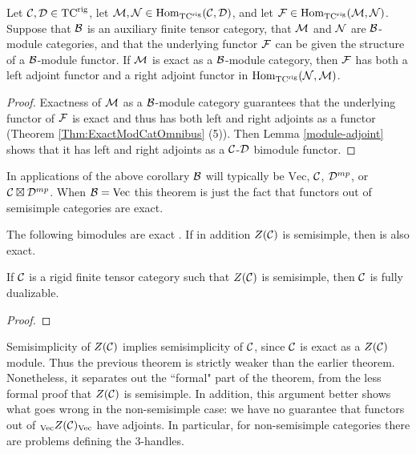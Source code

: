 \documentclass{amsart}
\begin{document}

\begin{lemma} \label{lma:2morAdjunction}
Let $\mathcal C, \mathcal D \in {\mathrm{TC}^{\text{rig}}}$, let $\mathcal M, \mathcal N \in \operatorname{Hom}_{\mathrm{TC}^{\text{rig}}}(\mathcal C,\mathcal D)$, and let $\mathcal F \in \operatorname{Hom}_{{\mathrm{TC}^{\text{rig}}}}(\mathcal M,\mathcal N)$.  Suppose that $\mathcal B$ is an auxiliary finite tensor category, that $\mathcal M$ and $\mathcal N$ are $\mathcal B$-module categories, and that the underlying functor $\mathcal F$ can be given the structure of a $\mathcal B$-module functor.  If $\mathcal M$ is exact as a $\mathcal B$-module category, then $\mathcal F$ has both a left adjoint functor and a right adjoint functor in $\operatorname{Hom}_{{\mathrm{TC}^{\text{rig}}}}(\mathcal N,\mathcal M)$.  
\end{lemma}
\begin{proof}
Exactness of $\mathcal M$ as a $\mathcal B$-module category guarantees that the underlying functor of $\mathcal F$ is exact and thus has both left and right adjoints as a functor (Theorem \ref{Thm:ExactModCatOmnibus} (5)).  Then Lemma \ref{module-adjoint} shows that it has left and right adjoints as a $\mathcal C$-$\mathcal D$ bimodule functor.
\end{proof}

\begin{remark}
In applications of the above corollary $\mathcal B$ will typically be $\mathrm{Vec}$, $\mathcal C$, $\mathcal D^{mp}$, or $\mathcal C \boxtimes \mathcal D^{mp}$.  When $\mathcal B = \mathrm{Vec}$ this theorem is just the fact that functors out of semisimple categories are exact.
\end{remark}

\begin{lemma}
The following bimodules are exact .  If in addition $Z(\mathcal C)$ is semisimple, then  is also exact.
\end{lemma}

\begin{theorem}
If $\mathcal C$ is a rigid finite tensor category such that $Z(\mathcal C)$ is semisimple, then $\mathcal C$ is fully dualizable.
\end{theorem}
\begin{proof}
\end{proof}

\begin{remark}
Semisimplicity of $Z(\mathcal C)$ implies semisimplicity of $\mathcal C$, since $\mathcal C$ is exact as a $Z(\mathcal C)$ module.  Thus the previous theorem is strictly weaker than the earlier theorem.  Nonetheless, it separates out the ``formal" part of the theorem, from the less formal proof that $Z(\mathcal C)$ is semisimple.  In addition, this argument better shows what goes wrong in the non-semisimple case: we have no guarantee that functors out of ${}_{\mathrm{Vec}} Z(\mathcal C)_{\mathrm{Vec}}$ have adjoints.  In particular, for non-semisimple categories there are problems defining the $3$-handles.
\end{remark}
\end{document}
